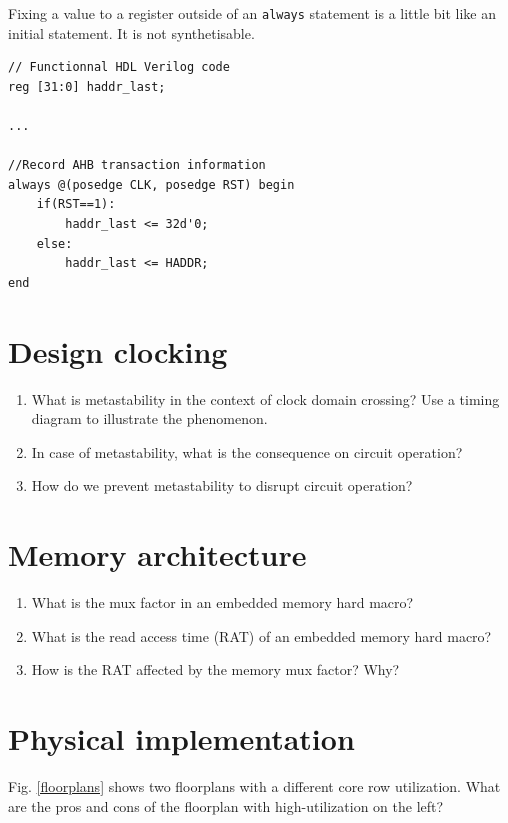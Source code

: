 \documentclass[fr]{sourcefiles/eplexam} %
\begin{document}
\begin{solution}
Fixing a value to a register outside of an \verb|always| statement is a little bit like an initial statement. It is not synthetisable.
\begin{lstlisting}[style={verilog-style}]
// Functionnal HDL Verilog code
reg [31:0] haddr_last;

...

//Record AHB transaction information
always @(posedge CLK, posedge RST) begin
    if(RST==1):
        haddr_last <= 32d'0;
    else:
        haddr_last <= HADDR;
end
\end{lstlisting}
\end{solution}


\section{Design clocking}
\begin{enumerate}
    \item What is metastability in the context of clock domain crossing? Use a timing diagram to illustrate the phenomenon.
    \item  In case of metastability, what is the consequence on circuit operation?
    \item How do we prevent metastability to disrupt circuit operation?
\end{enumerate}
\nosolution


\section{Memory architecture}
\begin{enumerate}
    \item What is the mux factor in an embedded memory hard macro?
    \item  What is the read access time (RAT) of an embedded memory hard macro?
    \item How is the RAT affected by the memory mux factor? Why?
\end{enumerate}
\nosolution


\section{ Physical implementation}
\noindent Fig. \ref{floorplans} shows two floorplans with a different core row utilization. What are the pros and cons of the floorplan with high-utilization on the left?
\end{document}
